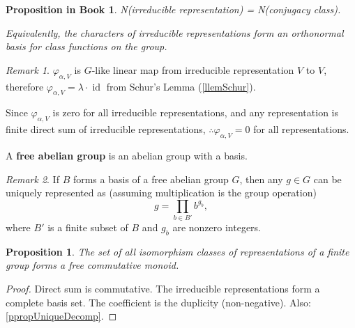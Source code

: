 \documentclass[12pt, letterpaper]{article}
\newcommand{\idt}{\operatorname{id}}
\newtheorem{prop}{Proposition}[section]
\theoremstyle{definition}
\theoremstyle{remark}
\newtheorem*{rem*}{Remark}
\theoremstyle{definition}
\theoremstyle{plain}
\newtheorem{pprop}[exe]{Proposition in Book}
\numberwithin{equation}{section}
\begin{document}
	\begin{pprop}
		N(irreducible representation) = N(conjugacy class).
		
		Equivalently, the characters of irreducible representations form an 
		orthonormal basis for class functions on the group.
	\end{pprop}
	\begin{rem*}
		$\varphi_{\alpha,V}$ is $G$-like linear map from irreducible representation $V$ to $V$,
		therefore $\varphi_{\alpha,V}=\lambda \cdot \idt$ from Schur's Lemma (\ref{llemSchur}).
		
		Since $\varphi_{\alpha,V}$ is zero for all irreducible representations,
		and any representation is finite direct sum of irreducible representations,
		$\therefore\varphi_{\alpha,V}=0$ for all representations.
	\end{rem*}

	\begin{def*}
		A \textbf{free abelian group} is an abelian group with a basis.
	\end{def*}
	\begin{rem*}
		If $B$ forms a basis of a free abelian group $G$, then any $g\in G$ can be uniquely represented as
		(assuming multiplication is the group operation)
		\[ g = \prod_{b\in B'} b^{g_{b}}, \]
		where $B'$ is a finite subset of $B$ and $g_b$ are nonzero integers.
	\end{rem*}
	\begin{prop}
		The set of all isomorphism 
		classes of representations of a finite group forms a free commutative monoid.
	\end{prop}
	\begin{proof}
		Direct sum is commutative.
		The irreducible representations form a complete basis set.
		The coefficient is the duplicity (non-negative).
		Also: \ref{ppropUniqueDecomp}.
	\end{proof}
	
\end{document}
